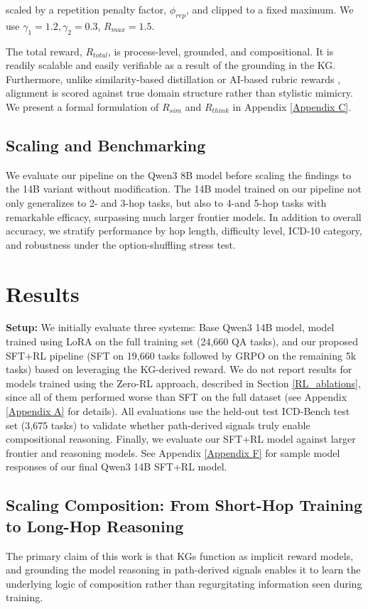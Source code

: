 \documentclass{article}
\theoremstyle{plain}
\theoremstyle{definition}
\theoremstyle{remark}
\begin{document}
scaled by a repetition penalty factor, $\phi_{rep}$, and clipped to a fixed maximum. We use $\gamma_1 = 1.2, \gamma_2 = 0.3$, $R_{max} = 1.5$.

The total reward, $R_{total}$, is process-level, grounded, and compositional. It is readily scalable and easily verifiable as a result of the grounding in the KG. Furthermore, unlike similarity-based distillation or AI-based rubric rewards \cite{GunjalRubrics}, alignment is scored against true domain structure rather than stylistic mimicry. We present a formal formulation of $R_{sim}$ and $R_{think}$ in Appendix \ref{Appendix C}.

\subsection{Scaling and Benchmarking}
We evaluate our pipeline on the Qwen3 8B model before scaling the findings to the 14B variant without modification. The 14B model trained on our pipeline not only generalizes to 2- and 3-hop tasks, but also to 4-and 5-hop tasks with remarkable efficacy, surpassing much larger frontier models. In addition to overall accuracy, we stratify performance by hop length, difficulty level, ICD-10 category, and robustness under the option-shuffling stress test. 

\section{Results}
\textbf{Setup:} We initially evaluate three systems: Base Qwen3 14B model, model trained using LoRA on the full training set (24,660 QA tasks), and our proposed SFT+RL pipeline (SFT on 19,660 tasks followed by GRPO on the remaining 5k tasks) based on leveraging the KG-derived reward. We do not report results for models trained using the Zero-RL approach, described in Section \ref{RL_ablations}, since all of them performed worse than SFT on the full dataset (see Appendix \ref{Appendix A} for details). All evaluations use the held-out test ICD-Bench test set (3,675 tasks) to validate whether path-derived signals truly enable compositional reasoning. Finally, we evaluate our SFT+RL model against larger frontier and reasoning models. See Appendix \ref{Appendix F} for sample model responses of our final Qwen3 14B SFT+RL model.

\subsection{Scaling Composition: From Short-Hop Training to Long-Hop Reasoning}
The primary claim of this work is that KGs function as implicit reward models, and grounding the model reasoning in path-derived signals enables it to learn the underlying logic of composition rather than regurgitating information seen during training.
\end{document}
